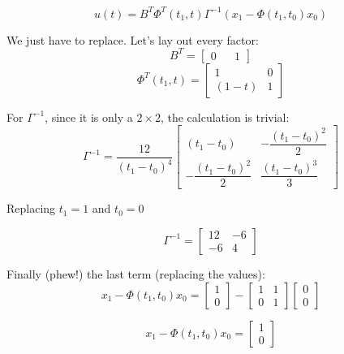 \documentclass[10pt,a4paper]{article}
\begin{document}
\[ u(t) = B^{T}\Phi^{T}(t_{1},t)\Gamma^{-1}(x_{1} - \Phi(t_{1}, t_{0})x_{0}) \]

We just have to replace. Let's lay out every factor:
\begin{equation}
B^{T} = \begin{bmatrix} 0 && 1 \end{bmatrix} 
\label{Eq:P1-BT}
\end{equation}
\begin{equation}
\Phi^{T}(t_{1},t)  = \begin{bmatrix} 1 & 0 \\ (1 - t) & 1 \end{bmatrix} 
\label{Eq:P1-Phi}
\end{equation}

For $\Gamma^{-1}$, since it is only a $2 \times 2$, the calculation is trivial:
\[ 
\Gamma^{-1} =
\dfrac{12}{(t_{1} - t_{0})^{4}}
\begin{bmatrix} 
(t_{1} - t_{0}) & -\dfrac{(t_{1} - t_{0})^{2}}{2} \\ 
-\dfrac{(t_{1} - t_{0})^{2}}{2} &  \dfrac{(t_{1} - t_{0})^{3}}{3}
\end{bmatrix} 
\]

Replacing $t_{1} = 1$ and $t_{0} = 0$

\begin{equation}
\Gamma^{-1} =
\begin{bmatrix} 
12 & -6 \\ 
-6 & 4
\end{bmatrix} 
\label{Eq:P1-Gamma}
\end{equation}

Finally (phew!) the last term (replacing the values):
\[x_{1} - \Phi(t_{1}, t_{0})x_{0} = 
\begin{bmatrix} 1 \\ 0 \end{bmatrix}
-
\begin{bmatrix} 
1 & 1 \\ 
0 & 1
\end{bmatrix} 
\begin{bmatrix} 0 \\ 0 \end{bmatrix}
\]

\begin{equation}
x_{1} - \Phi(t_{1}, t_{0})x_{0} = \begin{bmatrix} 1 \\ 0 \end{bmatrix}
\label{Eq:P1-Diff}
\end{equation}
\end{document}
